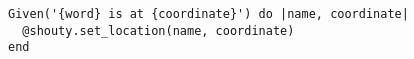 \begin{verbatim}
Given('{word} is at {coordinate}') do |name, coordinate|
  @shouty.set_location(name, coordinate)
end
\end{verbatim}
